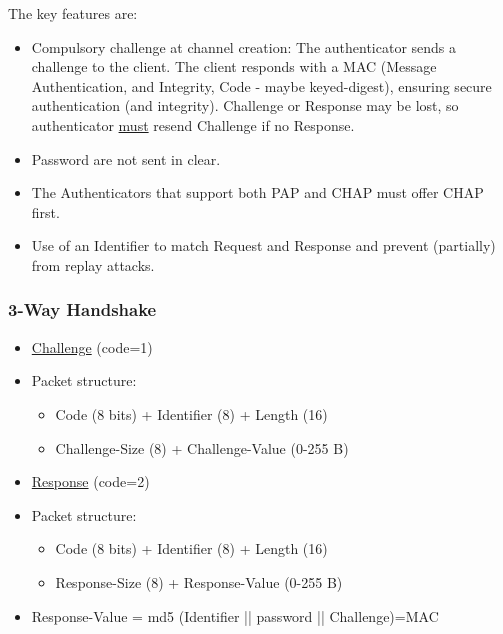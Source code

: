 The key features are: 
\begin{itemize}
    \item Compulsory challenge at channel creation: The authenticator sends a challenge to the client. The client responds with a MAC (Message Authentication, and Integrity, Code - maybe keyed-digest), ensuring secure authentication (and integrity). Challenge or Response may be lost, so authenticator \underline{must} resend Challenge if no Response.
    \item Password are not sent in clear.
    \item The Authenticators that support both PAP and CHAP must offer CHAP first.
    \item Use of an Identifier to match Request and Response and prevent (partially) from replay attacks.
\end{itemize}

\subsubsection*{3-Way Handshake}


\begin{tcolorbox}[colback=yellow!10!white, colframe=yellow!70!black, title=Authenticator \textrightarrow Peer] 
    
    \begin{itemize}
        \item \underline{Challenge} (code=1)
        \item Packet structure:
        \begin{itemize}
            \item Code (8 bits) + Identifier (8) + Length (16)
            \item Challenge-Size (8) + Challenge-Value (0-255 B)
        \end{itemize}
    \end{itemize}
\end{tcolorbox}


\begin{tcolorbox}[colback=yellow!10!white, colframe=yellow!70!black, title=Peer \textrightarrow Authenticator] 
    
    \begin{itemize}
        \item \underline{Response} (code=2)
        \item Packet structure:
        \begin{itemize}
            \item Code (8 bits) + Identifier (8) + Length (16)
            \item Response-Size (8) + Response-Value (0-255 B)
        \end{itemize}
        \item Response-Value = md5 (Identifier || password || Challenge)=MAC
    \end{itemize}
\end{tcolorbox}




